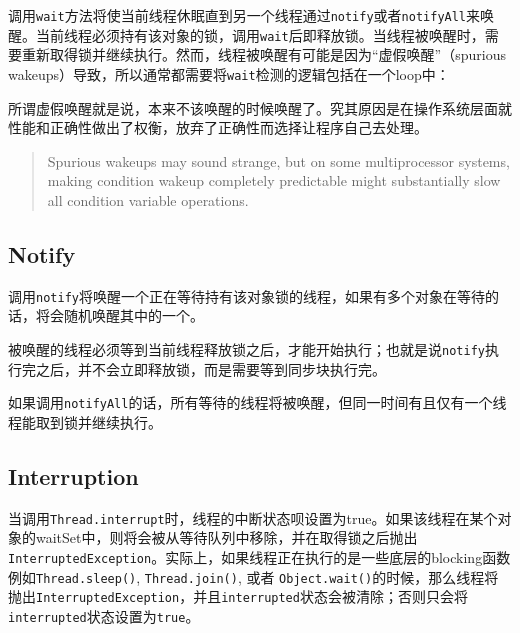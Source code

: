 \documentclass[12pt]{article}
\begin{document}
调用\texttt{wait}方法将使当前线程休眠直到另一个线程通过\texttt{notify}或者\texttt{notifyAll}来唤醒。当前线程必须持有该对象的锁，调用\texttt{wait}后即释放锁。当线程被唤醒时，需要重新取得锁并继续执行。然而，线程被唤醒有可能是因为``虚假唤醒''（spurious wakeups）导致，所以通常都需要将\texttt{wait}检测的逻辑包括在一个loop中：

\begin{Shaded}
\begin{Highlighting}[]
 \OperatorTok{(}\OperatorTok{)} \OperatorTok{\{}
     \OperatorTok{(\textless{}}\OperatorTok{\textgreater{})}
\OperatorTok{();}
\OperatorTok{\}}
\end{Highlighting}
\end{Shaded}

所谓虚假唤醒就是说，本来不该唤醒的时候唤醒了。究其原因是在操作系统层面就性能和正确性做出了权衡，放弃了正确性而选择让程序自己去处理。

\begin{quote}
Spurious wakeups may sound strange, but on some multiprocessor systems, making condition wakeup completely predictable might substantially slow all condition variable operations.
\end{quote}

\subsection{Notify}\label{notify}

调用\texttt{notify}将唤醒一个正在等待持有该对象锁的线程，如果有多个对象在等待的话，将会随机唤醒其中的一个。

被唤醒的线程必须等到当前线程释放锁之后，才能开始执行；也就是说\texttt{notify}执行完之后，并不会立即释放锁，而是需要等到同步块执行完。

如果调用\texttt{notifyAll}的话，所有等待的线程将被唤醒，但同一时间有且仅有一个线程能取到锁并继续执行。

\subsection{Interruption}\label{interruption}

当调用\texttt{Thread.interrupt}时，线程的中断状态呗设置为true。如果该线程在某个对象的waitSet中，则将会被从等待队列中移除，并在取得锁之后抛出\texttt{InterruptedException}。实际上，如果线程正在执行的是一些底层的blocking函数例如\texttt{Thread.sleep()}, \texttt{Thread.join()}, 或者 \texttt{Object.wait()}的时候，那么线程将抛出\texttt{InterruptedException}，并且\texttt{interrupted}状态会被清除；否则只会将\texttt{interrupted}状态设置为\texttt{true}。
\end{document}
